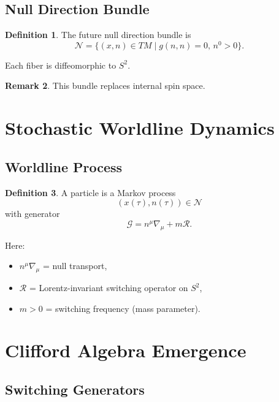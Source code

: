 \documentclass[11pt]{article}
\theoremstyle{definition}
\newtheorem{definition}{Definition}[section]
\newtheorem{remark}[definition]{Remark}
\begin{document}
\subsection{Null Direction Bundle}

\begin{definition}
The future null direction bundle is
\[
\mathcal{N}
=
\{ (x,n)\in TM \mid g(n,n)=0,\, n^0>0 \}.
\]
\end{definition}

Each fiber is diffeomorphic to $S^2$.

\begin{remark}
This bundle replaces internal spin space.
\end{remark}

\section{Stochastic Worldline Dynamics}

\subsection{Worldline Process}

\begin{definition}
A particle is a Markov process
\[
(x(\tau), n(\tau)) \in \mathcal{N}
\]
with generator
\[
\mathcal{G}
=
n^\mu \nabla_\mu
+
m \mathcal{R}.
\]
\end{definition}

Here:

\begin{itemize}
\item $n^\mu \nabla_\mu$ = null transport,
\item $\mathcal{R}$ = Lorentz-invariant switching operator on $S^2$,
\item $m>0$ = switching frequency (mass parameter).
\end{itemize}

\section{Clifford Algebra Emergence}

\subsection{Switching Generators}
\end{document}
